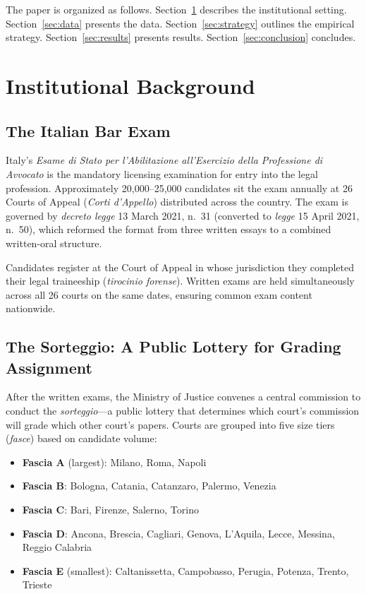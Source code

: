 \documentclass[11pt]{article}
\begin{document}
The paper is organized as follows. Section~\ref{sec:background} describes the institutional setting. Section~\ref{sec:data} presents the data. Section~\ref{sec:strategy} outlines the empirical strategy. Section~\ref{sec:results} presents results. Section~\ref{sec:conclusion} concludes.

\section{Institutional Background} \label{sec:background}

\subsection{The Italian Bar Exam}

Italy's \textit{Esame di Stato per l'Abilitazione all'Esercizio della Professione di Avvocato} is the mandatory licensing examination for entry into the legal profession. Approximately 20,000--25,000 candidates sit the exam annually at 26 Courts of Appeal (\textit{Corti d'Appello}) distributed across the country. The exam is governed by \textit{decreto legge} 13 March 2021, n.~31 (converted to \textit{legge} 15 April 2021, n.~50), which reformed the format from three written essays to a combined written-oral structure.

Candidates register at the Court of Appeal in whose jurisdiction they completed their legal traineeship (\textit{tirocinio forense}). Written exams are held simultaneously across all 26 courts on the same dates, ensuring common exam content nationwide.

\subsection{The Sorteggio: A Public Lottery for Grading Assignment}

After the written exams, the Ministry of Justice convenes a central commission to conduct the \textit{sorteggio}---a public lottery that determines which court's commission will grade which other court's papers. Courts are grouped into five size tiers (\textit{fasce}) based on candidate volume:

\begin{itemize}
  \item \textbf{Fascia A} (largest): Milano, Roma, Napoli
  \item \textbf{Fascia B}: Bologna, Catania, Catanzaro, Palermo, Venezia
  \item \textbf{Fascia C}: Bari, Firenze, Salerno, Torino
  \item \textbf{Fascia D}: Ancona, Brescia, Cagliari, Genova, L'Aquila, Lecce, Messina, Reggio Calabria
  \item \textbf{Fascia E} (smallest): Caltanissetta, Campobasso, Perugia, Potenza, Trento, Trieste
\end{itemize}
\end{document}
